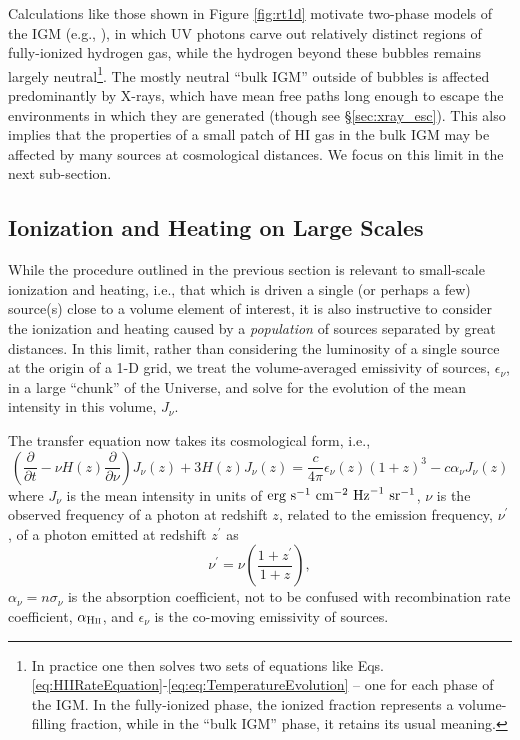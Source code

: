 Calculations like those shown in Figure \ref{fig:rt1d} motivate two-phase models of the IGM (e.g., \cite{Furlanetto2006,Pritchard2010,Mirocha2015}), in which UV photons carve out relatively distinct regions of fully-ionized hydrogen gas, while the hydrogen beyond these bubbles remains largely neutral\footnote{In practice one then solves two sets of equations like Eqs. \ref{eq:HIIRateEquation}-\ref{eq:eq:TemperatureEvolution} -- one for each phase of the IGM. In the fully-ionized phase, the ionized fraction represents a volume-filling fraction, while in the ``bulk IGM'' phase, it retains its usual meaning.}. The mostly neutral ``bulk IGM'' outside of bubbles is affected predominantly by X-rays, which have mean free paths long enough to escape the environments in which they are generated (though see \S\ref{sec:xray_esc}). This also implies that the properties of a small patch of HI gas in the bulk IGM may be affected by many sources at cosmological distances. We focus on this limit in the next sub-section. 


\subsection{Ionization and Heating on Large Scales} \label{sec:largescales}
While the procedure outlined in the previous section is relevant to small-scale ionization and heating, i.e., that which is driven a single (or perhaps a few) source(s) close to a volume element of interest, it is also instructive to consider the ionization and heating caused by a \textit{population} of sources separated by great distances. In this limit, rather than considering the luminosity of a single source at the origin of a 1-D grid, we treat the volume-averaged emissivity of sources, $\epsilon_{\nu}$, in a large ``chunk'' of the Universe, and solve for the evolution of the mean intensity in this volume, $J_{\nu}$.

The transfer equation now takes its cosmological form, i.e., 
\begin{equation}
    \left(\frac{\partial}{\partial t} - \nu H(z) \frac{\partial}{\partial \nu} \right) J_{\nu}(z) + 3 H(z) J_{\nu}(z) =  \frac{c}{4\pi} \epsilon_{\nu}(z) (1 + z)^3 - c \alpha_{\nu} J_{\nu}(z) \label{eq:rte_diffeq}
\end{equation}
where $J_{\nu}$ is the mean intensity in units of $\text{erg} \ \text{s}^{-1} \ \text{cm}^{-2} \ \mathrm{Hz}^{-1} \ \text{sr}^{-1}$, $\nu$ is the observed frequency of a photon at redshift $z$, related to the emission frequency, $\nu^{\prime}$, of a photon emitted at redshift $z^{\prime}$ as
\begin{equation}
    \nu^{\prime} = \nu \left(\frac{1 + z^{\prime}}{1 + z}\right) , \label{eq:EmissionFrequency}
\end{equation}
$\alpha_{\nu} = n \sigma_{\nu}$ is the absorption coefficient, not to be confused with recombination rate coefficient, $\alpha_{\text{H} {\textsc{ii}}}$, and $\epsilon_{\nu}$ is the co-moving emissivity of sources.

